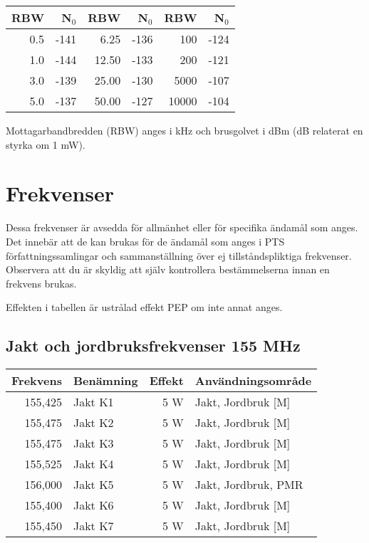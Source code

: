 \begin{center}
\begin{tabular}{rr|rr|rr}
	\textbf{RBW} & \textbf{N$_0$} & \textbf{RBW} & \textbf{N$_0$} & \textbf{RBW} & \textbf{N$_0$} \\ \hline
	         0.5 &           -141 &         6.25 &           -136 &          100 &           -124 \\
	         1.0 &           -144 &        12.50 &           -133 &          200 &           -121 \\
	         3.0 &           -139 &        25.00 &           -130 &         5000 &           -107 \\
	         5.0 &           -137 &        50.00 &           -127 &        10000 &           -104
\end{tabular}
\end{center}

Mottagarbandbredden (RBW) anges i kHz och brusgolvet i dBm (dB relaterat en styrka om 1 mW).

\section{Frekvenser}

Dessa frekvenser är avsedda för allmänhet eller för specifika ända\-mål som anges. Det innebär att de kan brukas för de ändamål som anges i PTS för\-fatt\-nings\-sam\-ling\-ar och sammanställning över ej tillståndspliktiga frekvenser. Observera att du är skyldig att själv kontrollera bestämmelserna innan en frekvens brukas.

Effekten i tabellen är ustrålad effekt PEP om inte annat anges.

\subsection{Jakt och jordbruksfrekvenser 155 MHz}
\begin{tabular}{rlrl}
	\textbf{Frekvens} & \textbf{Benämning} & \textbf{Effekt} & \textbf{Användningsområde} \\ \hline
	          155,425 & Jakt K1            &             5 W & Jakt, Jordbruk [M]         \\
	          155,475 & Jakt K2            &             5 W & Jakt, Jordbruk [M]         \\
	          155,475 & Jakt K3            &             5 W & Jakt, Jordbruk [M]         \\
	          155,525 & Jakt K4            &             5 W & Jakt, Jordbruk [M]         \\
	          156,000 & Jakt K5            &             5 W & Jakt, Jordbruk, PMR        \\
	          155,400 & Jakt K6            &             5 W & Jakt, Jordbruk [M]         \\
	          155,450 & Jakt K7            &             5 W & Jakt, Jordbruk [M]
\end{tabular}

